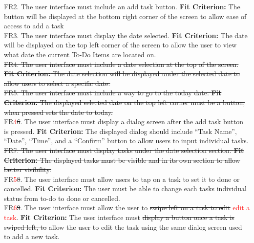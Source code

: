 \documentclass[12pt, titlepage]{article}
\begin{document}
\noindent FR2. The user interface must include an add task button.
	\textbf{Fit Criterion:} The button will be displayed at the bottom right corner of the screen to 
allow ease of access to add a task\\

\noindent FR3. The user interface must display the date selected.
	\textbf{Fit Criterion:} The date will be displayed on the top left corner of the screen to allow the 
user to view what date the current To-Do Items are located on.\\

\noindent \sout{FR4. The user interface must include a date selection at the top of the screen.
	\textbf{Fit Criterion:} The date selection will be displayed under the selected date to allow users 
to select a specific date.}\\

\noindent \sout{FR5. The user interface must include a way to go to the today date.
	\textbf{Fit Criterion:} The displayed selected date on the top left corner must be a button, when 
pressed sets the date to today.}\\

\noindent FR\textcolor{red}{4}\sout{6}. The user interface must display a dialog screen after the add task button is pressed.
	\textbf{Fit Criterion:} The displayed dialog should include “Task Name”, “Date”, “Time”, and a 
“Confirm” button to allow users to input individual tasks.\\

\noindent \sout{FR7. The user interface must display tasks under the date selection section.
	\textbf{Fit Criterion:} The displayed tasks must be visible and in its own section to allow better 
visibility.}\\

\noindent FR\textcolor{red}{5}\sout{8}. The user interface must allow users to tap on a task to set it to done or cancelled.
	\textbf{Fit Criterion:} The user must be able to change each tasks individual status from to-do to 
done or cancelled. \\

\noindent FR\textcolor{red}{6}\sout{9}. The user interface must allow the user to \sout{swipe left on a task to edit} \textcolor{red}{edit a task}.
	\textbf{Fit Criterion:} The user interface must \sout{display a button once a task is swiped left, to} 
allow the user to edit the task using the same dialog screen used to add a new task.\\
\end{document}
